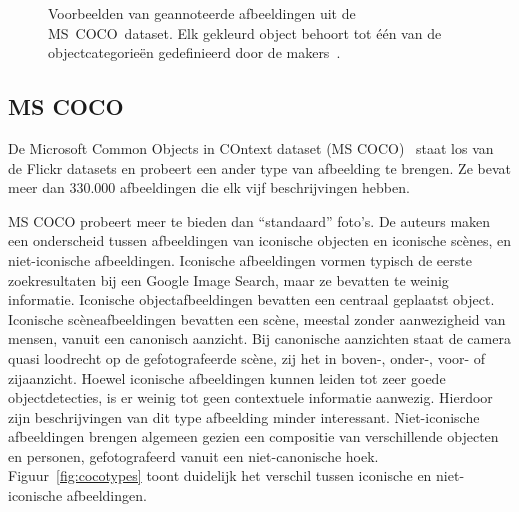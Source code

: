 		\begin{figure}
			\centering
			\hfill
					\caption[Voorbeelden van geannoteerde afbeeldingen uit de \mbox{MS COCO dataset}]{Voorbeelden van geannoteerde afbeeldingen uit de \mbox{MS COCO dataset}. Elk gekleurd object behoort tot \'e\'en van de objectcategorie\"en gedefinieerd door de makers~\cite{Lin2014}.}
					\label{fig:cocoexamples}
					\end{figure}


\subsection{MS COCO}
\label{par:MS COCO}
De Microsoft Common Objects in COntext dataset (MS COCO)~\cite{Lin2014} staat los van de Flickr datasets en probeert een ander type van afbeelding te brengen. Ze bevat meer dan 330.000 afbeeldingen die elk vijf beschrijvingen hebben. 

MS COCO probeert meer te bieden dan ``standaard'' foto's. De auteurs maken een onderscheid tussen afbeeldingen van iconische objecten en iconische sc\`enes, en niet-iconische afbeeldingen. Iconische afbeeldingen vormen typisch de eerste zoekresultaten bij een Google Image Search, maar ze bevatten te weinig informatie. Iconische objectafbeeldingen bevatten een centraal geplaatst object. Iconische sc\`eneafbeeldingen bevatten een sc\`ene, meestal zonder aanwezigheid van mensen, vanuit een canonisch aanzicht. Bij canonische aanzichten staat de camera quasi loodrecht op de gefotografeerde sc\`ene, zij het in boven-, onder-, voor- of zijaanzicht. Hoewel iconische afbeeldingen kunnen leiden tot zeer goede objectdetecties, is er weinig tot geen contextuele informatie aanwezig. Hierdoor zijn beschrijvingen van dit type afbeelding minder interessant.  Niet-iconische afbeeldingen brengen algemeen gezien een compositie van verschillende objecten en personen, gefotografeerd vanuit een niet-canonische hoek. Figuur~\ref{fig:cocotypes} toont duidelijk het verschil tussen iconische en niet-iconische afbeeldingen.

